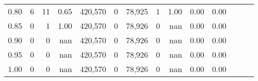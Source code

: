 \begin{tabular}{rrrrrrrrrrrrrr}
0.80 &        6 &      11 &  0.65 &  420,570 &        0 &  78,925 &       1 &  1.00 &  0.00 &      0.00 \\
0.85 &        0 &       1 &  1.00 &  420,570 &        0 &  78,926 &       0 &   nan &  0.00 &      0.00 \\
0.90 &        0 &       0 &   nan &  420,570 &        0 &  78,926 &       0 &   nan &  0.00 &      0.00 \\
0.95 &        0 &       0 &   nan &  420,570 &        0 &  78,926 &       0 &   nan &  0.00 &      0.00 \\
1.00 &        0 &       0 &   nan &  420,570 &        0 &  78,926 &       0 &   nan &  0.00 &      0.00 \\
\bottomrule
\end{tabular}
